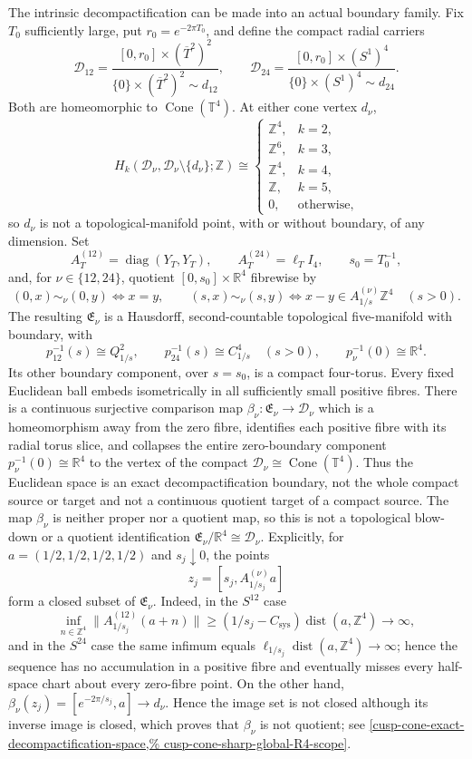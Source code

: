 \begin{enumerate}[leftmargin=1.8em,itemsep=.65em]
The intrinsic decompactification can be made into an actual boundary family.
Fix \(T_0\) sufficiently large, put \(r_0=e^{-2\pi T_0}\), and define the
compact radial carriers
\[
 \mathcal D_{12}
 =\frac{[0,r_0]\times(\overline T^2)^2}
 {\{0\}\times(\overline T^2)^2\sim d_{12}},
 \qquad
 \mathcal D_{24}
 =\frac{[0,r_0]\times(S^1)^4}
 {\{0\}\times(S^1)^4\sim d_{24}}.
\]
Both are homeomorphic to \(\operatorname{Cone}(\mathbb T^4)\).  At either
cone vertex \(d_\nu\),
\[
 H_k(\mathcal D_\nu,\mathcal D_\nu\setminus\{d_\nu\};\mathbb Z)
 \cong
 \begin{cases}
  \mathbb Z^4,&k=2,\\
  \mathbb Z^6,&k=3,\\
  \mathbb Z^4,&k=4,\\
  \mathbb Z,&k=5,\\
  0,&\text{otherwise},
 \end{cases}
\]
so \(d_\nu\) is not a topological-manifold point, with or without boundary,
of any dimension.  Set
\[
 A_T^{(12)}=\operatorname{diag}(Y_T,Y_T),\qquad
 A_T^{(24)}=\ell_T I_4,\qquad s_0=T_0^{-1},
\]
and, for \(\nu\in\{12,24\}\), quotient
\([0,s_0]\times\mathbb R^4\) fibrewise by
\[
 (0,x)\sim_\nu(0,y)\iff x=y,\qquad
 (s,x)\sim_\nu(s,y)\iff
 x-y\in A_{1/s}^{(\nu)}\mathbb Z^4\quad(s>0).
\]
The resulting \(\mathfrak E_\nu\) is a Hausdorff, second-countable topological
five-manifold with boundary, with
\[
 p_{12}^{-1}(s)\cong Q_{1/s}^2,\qquad
 p_{24}^{-1}(s)\cong C_{1/s}^4\quad(s>0),\qquad
 p_\nu^{-1}(0)\cong\mathbb R^4.
\]
Its other boundary component, over \(s=s_0\), is a compact four-torus.
Every fixed Euclidean ball embeds isometrically in all sufficiently small
positive fibres.  There is a continuous surjective comparison map
\(\beta_\nu:\mathfrak E_\nu\to\mathcal D_\nu\) which is a homeomorphism away
from the zero fibre, identifies each positive fibre with its radial torus
slice, and collapses the entire zero-boundary component
\(p_\nu^{-1}(0)\cong\mathbb R^4\) to the vertex of the
compact
\(\mathcal D_\nu\cong\operatorname{Cone}(\mathbb T^4)\).  Thus the Euclidean
space is an exact decompactification boundary, not the whole compact source or
target and not a continuous quotient target of a compact source.  The map
\(\beta_\nu\) is neither proper nor a quotient map, so this is not a
topological blow-down or a quotient identification
\(\mathfrak E_\nu/\mathbb R^4\cong\mathcal D_\nu\).  Explicitly, for
\(a=(1/2,1/2,1/2,1/2)\) and \(s_j\downarrow0\), the points
\[
 z_j=[s_j,A_{1/s_j}^{(\nu)}a]
\]
form a closed subset of \(\mathfrak E_\nu\).  Indeed, in the \(S^{12}\) case
\[
 \inf_{n\in\mathbb Z^4}\lVert A_{1/s_j}^{(12)}(a+n)\rVert
 \ge(1/s_j-C_{\mathrm{sys}})\operatorname{dist}(a,\mathbb Z^4)\to\infty,
\]
and in the \(S^{24}\) case the same infimum equals
\(\ell_{1/s_j}\operatorname{dist}(a,\mathbb Z^4)\to\infty\); hence the
sequence has no accumulation in a positive fibre and eventually misses every
half-space chart about every zero-fibre point.  On the other hand,
\(\beta_\nu(z_j)=[e^{-2\pi/s_j},a]\to d_\nu\).  Hence the image set is not
closed although its inverse image is closed, which proves that
\(\beta_\nu\) is not quotient;
see \cref{cusp-cone-exact-decompactification-space,%
cusp-cone-sharp-global-R4-scope}.


\end{enumerate}

